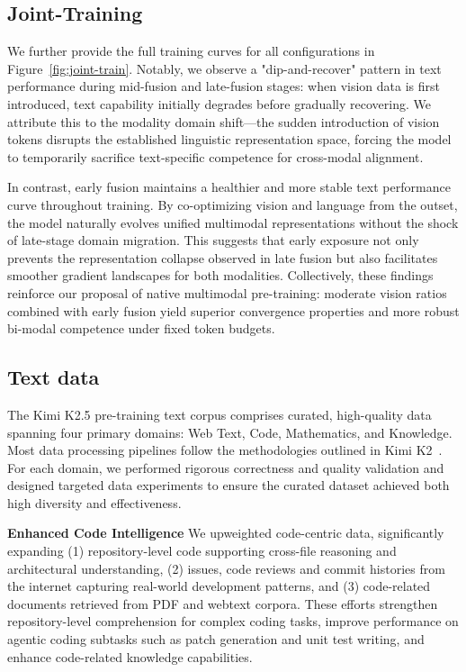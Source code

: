 \documentclass{article}
\newcommand{\citep}[1]{\parencite{#1}}
\begin{document}
\subsection{Joint-Training}
We further provide the full training curves for all configurations in Figure~\ref{fig:joint-train}. Notably, we observe a "dip-and-recover" pattern in text performance during mid-fusion and late-fusion stages: when vision data is first introduced, text capability initially degrades before gradually recovering. We attribute this to the modality domain shift—the sudden introduction of vision tokens disrupts the established linguistic representation space, forcing the model to temporarily sacrifice text-specific competence for cross-modal alignment.

In contrast, early fusion maintains a healthier and more stable text performance curve throughout training. By co-optimizing vision and language from the outset, the model naturally evolves unified multimodal representations without the shock of late-stage domain migration. This suggests that early exposure not only prevents the representation collapse observed in late fusion but also facilitates smoother gradient landscapes for both modalities. Collectively, these findings reinforce our proposal of native multimodal pre-training: moderate vision ratios combined with early fusion yield superior convergence properties and more robust bi-modal competence under fixed token budgets.

\subsection{Text data}
The Kimi K2.5 pre-training text corpus comprises curated, high-quality data spanning four primary domains: Web Text, Code, Mathematics, and Knowledge. Most data processing pipelines follow the methodologies outlined in Kimi K2~\citep{team2025kimik2}. For each domain, we performed rigorous correctness and quality validation and designed targeted data experiments to ensure the curated dataset achieved both high diversity and effectiveness.

\textbf{Enhanced Code Intelligence}
We upweighted code-centric data, significantly expanding (1) repository-level code supporting cross-file reasoning and architectural understanding, (2) issues, code reviews and commit histories from the internet capturing real-world development patterns, and (3) code-related documents retrieved from PDF and webtext corpora. These efforts strengthen repository-level comprehension for complex coding tasks, improve performance on agentic coding subtasks such as patch generation and unit test writing, and enhance code-related knowledge capabilities.
\end{document}
